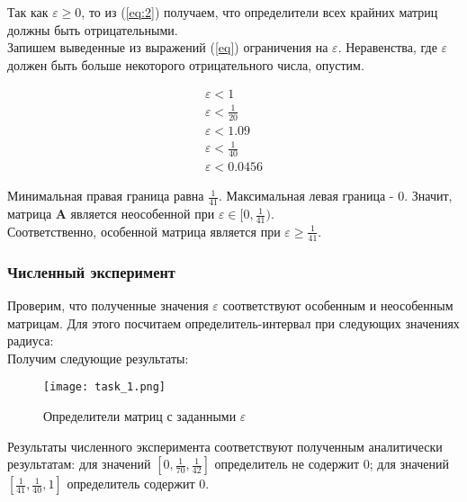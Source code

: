 Так как $\varepsilon \geq 0$, то из (\ref{eq:2}) получаем, что определители всех крайних матриц должны быть отрицательными. \\
Запишем выведенные из выражений (\ref{eq}) ограничения на $\varepsilon$. Неравенства, где $\varepsilon$ должен быть больше некоторого отрицательного числа, опустим.

\begin{subequations}
	\begin{align}
		\varepsilon < 1	\label{eps:1} \\
		\varepsilon < \frac{1}{20}	\label{eps:2} \\
		\varepsilon < 1.09	\label{eps:3} \\
		\varepsilon < \frac{1}{40}	\label{eps:4} \\
		\varepsilon < 0.0456	\label{eps:5}
	\end{align}
\end{subequations}

Минимальная правая граница равна $\frac{1}{41}$. Максимальная левая граница - 0. Значит, матрица $\textbf{A}$ является неособенной при $\varepsilon \in [0, \frac{1}{41})$. \\

Соответственно, особенной матрица является при $\varepsilon \geq \frac{1}{41}$.


\subsubsection{Численный эксперимент}

Проверим, что полученные значения $\varepsilon$ соответствуют особенным и неособенным матрицам. Для этого посчитаем определитель-интервал при следующих значениях радиуса:
\begin{equation}
	[0, \frac{1}{70}, \frac{1}{42}, \frac{1}{41}, \frac{1}{40}, 1]
\end{equation}
Получим следующие результаты:

\newpage

\begin{figure}[h]
	\centering
	\texttt{[image: task\_1.png]}
	\caption{Определители матриц с заданными $\varepsilon$}
\end{figure}

Результаты численного эксперимента соответствуют полученным аналитически результатам: для значений $[0, \frac{1}{70}, \frac{1}{42}]$ определитель не содержит 0; для значений $[\frac{1}{41}, \frac{1}{40}, 1]$ определитель содержит 0.


